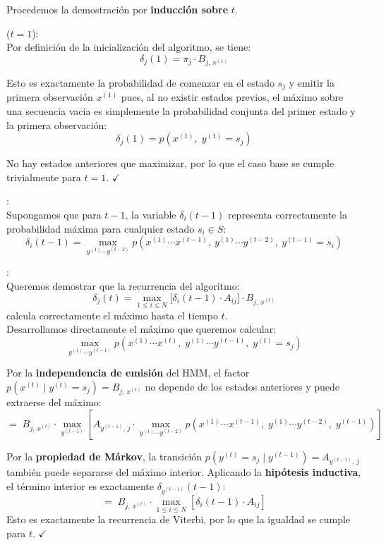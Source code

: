 Procedemos la demostración por \textbf{inducción sobre} $t$.

\bigskip

 ($t = 1$):\\
Por definición de la inicialización del algoritmo, se tiene:
\[
\delta_j(1) = \pi_j \cdot B_{j,\,x^{(1)}}
\]

Esto es exactamente la probabilidad de comenzar en el estado $s_j$ y emitir la primera observación $x^{(1)}$ pues,
al no existir estados previos, el máximo sobre una secuencia vacía es simplemente la probabilidad conjunta del
primer estado y la primera observación:
\[
\delta_j(1) = p\!\left(x^{(1)},\; y^{(1)} = s_j\right)
\]
  
No hay estados anteriores que maximizar, por lo que el caso base se cumple trivialmente para $t=1$. $\checkmark$

\bigskip

:\\
Supongamos que para $t-1$, la variable $\delta_i(t-1)$ representa correctamente la probabilidad máxima para
cualquier estado $s_i \in S$:
\[
\delta_i(t-1) = \max_{y^{(1)} \cdots y^{(t-2)}} p\!\left(x^{(1)} \cdots x^{(t-1)},\ y^{(1)} \cdots y^{(t-2)},\ y^{(t-1)} = s_i\right)
\]

\bigskip

:\\
Queremos demostrar que la recurrencia del algoritmo:
\[
\delta_j(t) = \max_{1 \leq i \leq N} \bigl[\delta_i(t-1)\cdot A_{ij}\bigr] \cdot B_{j,\,x^{(t)}}
\]
calcula correctamente el máximo hasta el tiempo $t$.\\

Desarrollamos directamente el máximo que queremos calcular:
\[
\max_{y^{(1)} \cdots y^{(t-1)}} p\!\left(x^{(1)} \cdots x^{(t)},\; y^{(1)} \cdots y^{(t-1)},\; y^{(t)} = s_j\right)
\]

Por la \textbf{independencia de emisión} del HMM, el factor $p(x^{(t)} \mid y^{(t)} = s_j) = B_{j,\,x^{(t)}}$ no
depende de los estados anteriores y puede extraerse del máximo:
\[
=\; B_{j,\,x^{(t)}} \cdot \max_{y^{(t-1)}}
\left[ A_{y^{(t-1)},\,j} \cdot \max_{y^{(1)} \cdots y^{(t-2)}} p\!\left(x^{(1)}
  \cdots x^{(t-1)},\; y^{(1)} \cdots y^{(t-2)},\; y^{(t-1)}\right) \right]
\]

Por la \textbf{propiedad de Márkov}, la transición $p(y^{(t)}=s_j \mid y^{(t-1)}) = A_{y^{(t-1)},\,j}$ también puede
separarse del máximo interior. Aplicando la \textbf{hipótesis inductiva}, el término interior es exactamente
$\delta_{y^{(t-1)}}(t-1)$:
\[
=\; B_{j,\,x^{(t)}} \cdot \max_{1 \leq i \leq N} \left[ \delta_i(t-1)\cdot A_{ij} \right]
\]
Esto es exactamente la recurrencia de Viterbi, por lo que la igualdad se cumple para $t$. $\checkmark$

